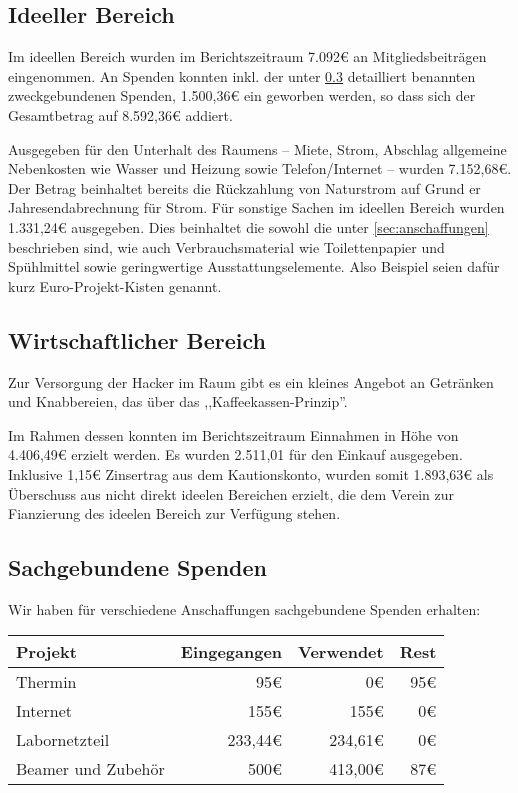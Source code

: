 \documentclass[10pt,DIV16]{scrartcl}
\begin{document}
\subsection{Ideeller Bereich}
\label{sec:ideeller_bereich}

Im ideellen Bereich wurden im Berichtszeitraum 7.092\euro{} an 
Mitgliedsbeiträgen eingenommen. An Spenden konnten inkl. der unter 
\ref{sec:sachegebundene_spenden} detailliert benannten zweckgebundenen 
Spenden, 1.500,36\euro{} ein geworben werden, so dass sich der 
Gesamtbetrag auf 8.592,36\euro{} addiert.

Ausgegeben für den Unterhalt des Raumens -- Miete, Strom, Abschlag 
allgemeine Nebenkosten wie Wasser und Heizung sowie Telefon/Internet -- 
wurden 7.152,68\euro{}. Der Betrag beinhaltet bereits die Rückzahlung 
von Naturstrom auf Grund er Jahresendabrechnung für Strom. Für sonstige 
Sachen im ideellen Bereich wurden 1.331,24\euro{} ausgegeben. Dies 
beinhaltet die sowohl die unter \ref{sec:anschaffungen} beschrieben 
sind, wie auch Verbrauchsmaterial wie Toilettenpapier und Spühlmittel 
sowie geringwertige Ausstattungselemente. Also Beispiel seien dafür 
kurz Euro-Projekt-Kisten genannt. 


\subsection{Wirtschaftlicher Bereich}
\label{sec:wirschaftlicher_bereich}

Zur Versorgung der Hacker im Raum gibt es ein kleines Angebot an
Getränken und Knabbereien, das über das ,,Kaffeekassen-Prinzip''. 

Im Rahmen dessen konnten im Berichtszeitraum Einnahmen in Höhe von 
4.406,49\euro{} erzielt werden. Es wurden 2.511,01 für den Einkauf 
ausgegeben. Inklusive 1,15\euro{} Zinsertrag aus dem Kautionskonto, 
wurden somit 1.893,63\euro{} als Überschuss aus nicht direkt ideelen 
Bereichen erzielt, die dem Verein zur Fianzierung des ideelen Bereich 
zur Verfügung stehen.

\subsection{Sachgebundene Spenden}
\label{sec:sachegebundene_spenden}
Wir haben für verschiedene Anschaffungen sachgebundene Spenden erhalten:

\begin{table}[h]
	\begin{tabular}{l|r|r|r}
	\textbf{Projekt} & \textbf{Eingegangen} & \textbf{Verwendet} & \textbf{Rest} \\ \hline
	Thermin & 95\euro & 0\euro & 95\euro \\
	Internet & 155\euro & 155\euro & 0\euro \\
	Labornetzteil & 233,44\euro & 234,61\euro & 0\euro{} \\
	Beamer und Zubehör & 500\euro & 413,00\euro & 87\euro \\
	\end{tabular}
\end{table}
\end{document}
